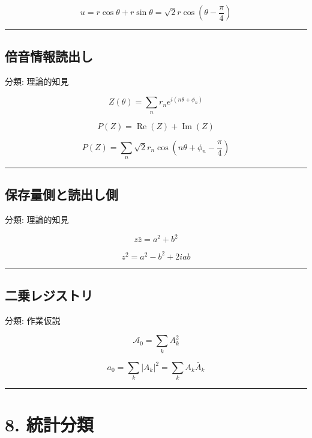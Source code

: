 \documentclass[
  a4paper,
]{ltjsarticle}
\begin{document}
\[
u=r\cos\theta+r\sin\theta
=\sqrt2 r\cos\left(\theta-\frac{\pi}{4}\right)
\]

\begin{center}\rule{0.5\linewidth}{0.5pt}\end{center}

\subsection{倍音情報読出し}\label{ux500dux97f3ux60c5ux5831ux8aadux51faux3057}

分類: 理論的知見

\[
Z(\theta)=\sum_n r_n e^{i(n\theta+\phi_n)}
\]

\[
P(Z)=\operatorname{Re}(Z)+\operatorname{Im}(Z)
\]

\[
P(Z)=\sum_n \sqrt2 r_n
\cos\left(n\theta+\phi_n-\frac{\pi}{4}\right)
\]

\begin{center}\rule{0.5\linewidth}{0.5pt}\end{center}

\subsection{保存量側と読出し側}\label{ux4fddux5b58ux91cfux5074ux3068ux8aadux51faux3057ux5074}

分類: 理論的知見

\[
z\bar z=a^2+b^2
\]

\[
z^2=a^2-b^2+2iab
\]

\begin{center}\rule{0.5\linewidth}{0.5pt}\end{center}

\subsection{二乗レジストリ}\label{ux4e8cux4e57ux30ecux30b8ux30b9ux30c8ux30ea}

分類: 作業仮説

\[
\mathcal{A}_0=\sum_k A_k^2
\]

\[
a_0=\sum_k |A_k|^2=\sum_k A_k\bar A_k
\]

\begin{center}\rule{0.5\linewidth}{0.5pt}\end{center}

\section{8. 統計分類}\label{ux7d71ux8a08ux5206ux985e}
\end{document}
